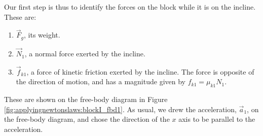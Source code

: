 \begin{example}
Our first step is thus to identify the forces on the block while it is on the incline. These are:
\begin{enumerate}
\item $\vec F_{g}$, its weight.
\item $\vec N_1$, a normal force exerted by the incline.
\item $\vec f_{k1}$, a force of kinetic friction exerted by the incline. The force is opposite of the direction of motion, and has a magnitude given by $f_{k1}=\mu_{k1}N_1$.
\end{enumerate}
These are shown on the free-body diagram in Figure \ref{fig:applyingnewtonslaws:blockI_fbd1}. As usual, we drew the acceleration, $\vec a_1$, on the free-body diagram, and chose the direction of the $x$ axis to be parallel to the acceleration. 



\end{example}
